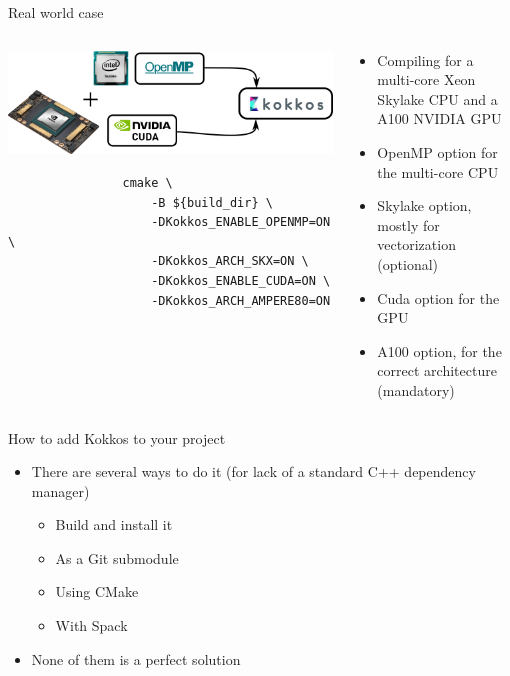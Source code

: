 \documentclass[
    aspectratio=169,
    handout,
]{beamer}
\begin{document}
\begin{frame}[fragile]{Real world case}
    \begin{columns}
        \begin{column}{0.475\linewidth}
            \begin{center}
                \includegraphics[width=\textwidth]{kokkos_a100_backend.png}
            \end{center}
            \begin{verbatim}
                cmake \
                    -B ${build_dir} \
                    -DKokkos_ENABLE_OPENMP=ON \
                    -DKokkos_ARCH_SKX=ON \
                    -DKokkos_ENABLE_CUDA=ON \
                    -DKokkos_ARCH_AMPERE80=ON
            \end{verbatim}
        \end{column}
        \begin{column}{0.525\linewidth}
            \begin{itemize}
                \item Compiling for a multi-core Xeon Skylake CPU and a A100 NVIDIA GPU
                \item OpenMP option for the multi-core CPU
                \item Skylake option, mostly for vectorization (optional)
                \item Cuda option for the GPU
                \item A100 option, for the correct architecture (mandatory)
            \end{itemize}
        \end{column}
    \end{columns}
\end{frame}


\begin{frame}{How to add Kokkos to your project}
    \begin{itemize}
        \item There are several ways to do it (for lack of a standard C++ dependency manager)
        \begin{itemize}
            \item Build and install it
            \item As a Git submodule
            \item Using CMake
            \item With Spack
        \end{itemize}
        \item None of them is a perfect solution
    \end{itemize}
\end{frame}
\end{document}

